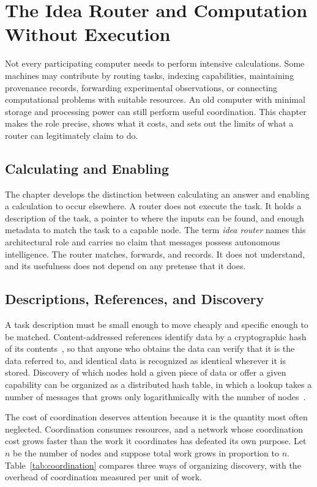 \chapter{The Idea Router and Computation Without Execution}
\label{ch:router}

Not every participating computer needs to perform intensive calculations. Some machines may contribute by routing tasks, indexing capabilities, maintaining provenance records, forwarding experimental observations, or connecting computational problems with suitable resources. An old computer with minimal storage and processing power can still perform useful coordination. This chapter makes the role precise, shows what it costs, and sets out the limits of what a router can legitimately claim to do.

\section{Calculating and Enabling}

The chapter develops the distinction between calculating an answer and enabling a calculation to occur elsewhere. A router does not execute the task. It holds a description of the task, a pointer to where the inputs can be found, and enough metadata to match the task to a capable node. The term \emph{idea router} names this architectural role and carries no claim that messages possess autonomous intelligence. The router matches, forwards, and records. It does not understand, and its usefulness does not depend on any pretense that it does.

\section{Descriptions, References, and Discovery}

A task description must be small enough to move cheaply and specific enough to be matched. Content-addressed references identify data by a cryptographic hash of its contents~\cite{benet2014}, so that anyone who obtains the data can verify that it is the data referred to, and identical data is recognized as identical wherever it is stored. Discovery of which nodes hold a given piece of data or offer a given capability can be organized as a distributed hash table, in which a lookup takes a number of messages that grows only logarithmically with the number of nodes~\cite{maymounkov2002}.

The cost of coordination deserves attention because it is the quantity most often neglected. Coordination consumes resources, and a network whose coordination cost grows faster than the work it coordinates has defeated its own purpose. Let $n$ be the number of nodes and suppose total work grows in proportion to $n$. Table~\ref{tab:coordination} compares three ways of organizing discovery, with the overhead of coordination measured per unit of work.


